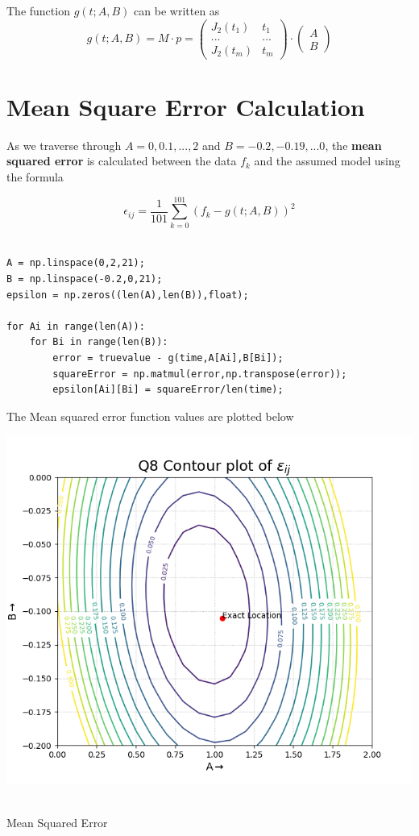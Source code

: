 \documentclass[12pt, a4paper]{report}
\begin{document}
The function $g(t;A,B)$ can be written as 
\begin{equation*}
 g(t;A,B) = M\cdot p = \begin{pmatrix}
J_{2}(t_{1}) & t_{1}\\
... & ... \\
J_{2}(t_{m}) & t_{m}
\end{pmatrix}
\cdot
\begin{pmatrix}
A\\B
\end{pmatrix}
\end{equation*}

\section*{Mean Square Error Calculation}
As we traverse through $A = 0,0.1,...,2$ and $B = -0.2,-0.19,...0$, the \textbf{mean squared error} is calculated between the data $f_k$ and the assumed model using the formula

\begin{equation}\label{eq:4}
\epsilon_{ij}=\frac{1}{101}\sum_{k=0}^{101}\left(f_{k}-g(t;A,B)\right)^{2}
\end{equation} 
\\
\begin{verbatim}
A = np.linspace(0,2,21); 
B = np.linspace(-0.2,0,21); 
epsilon = np.zeros((len(A),len(B)),float);

for Ai in range(len(A)): 
    for Bi in range(len(B)): 
        error = truevalue - g(time,A[Ai],B[Bi]); 
        squareError = np.matmul(error,np.transpose(error)); 
        epsilon[Ai][Bi] = squareError/len(time); 
\end{verbatim}
The Mean squared error function values are plotted below

\begin{center}
	\includegraphics[scale=0.85]{Figure_2} 
	\caption{\\Mean Squared Error}
	\label{fig:rawdata}
\end{center}
\end{document}
